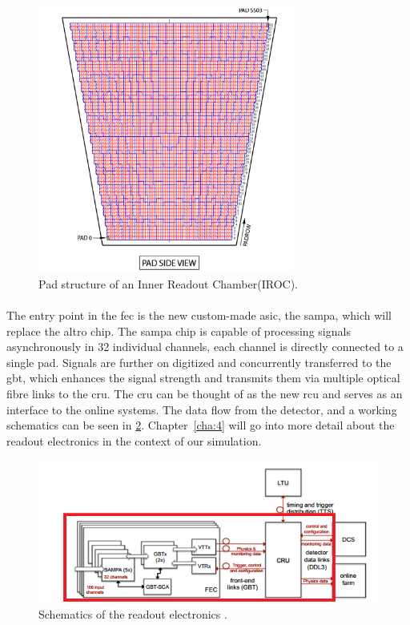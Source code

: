 \documentclass[a4paper, 12pt, openright, twoside]{report}
\begin{document}
\begin{figure}[h!]
	\centering
		\includegraphics[width=0.75\textwidth]{images/pad-structure.png}
		\caption[Pad structure of an Inner Readout Chamber(IROC)]{Pad structure of an Inner Readout Chamber(IROC)\cite{pad-structure}.}
		\label{fig:pad-struct}
\end{figure}

\paragraph{}
The entry point in the \gls{fec} is the new custom-made \gls{asic}, the \gls{sampa}, which will replace the \gls{altro} chip\cite{tdr-015}.
The \gls{sampa} chip is capable of processing signals asynchronously in 32 individual channels, each channel is directly connected to a single pad.
Signals are further on digitized and concurrently transferred to the \gls{gbt}, which enhances the signal strength and transmits them via multiple optical fibre links to the \gls{cru}.
The \gls{cru} can be thought of as the new \gls{rcu} and serves as an interface to the online systems.
The data flow from the detector, and a working schematics can be seen in \ref{fig:fec}.
Chapter~\ref{cha:4} will go into more detail about the readout electronics in the context of our simulation.

\begin{figure}[h!]
	\centering
		\includegraphics[width=1.0\textwidth]{images/fec.png}
		\caption[Schematics of the readout electronics]{Schematics of the readout electronics \cite{tdr-016}.}
		\label{fig:fec}
\end{figure}
\end{document}
